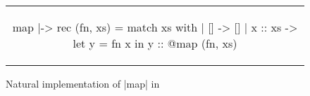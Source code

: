 \begin{figure}[tp]
\begin{tabular}{c}
\begin{Datalang}
map |-> rec (fn, xs) =
  match xs with
  | [] ->
      []
  | x :: xs ->
      let y = fn x in
      y :: @map (fn, xs)
\end{Datalang}
\end{tabular}
\caption{Natural implementation of \datalang|map| in \DataLang}
\label{fig:map}
\end{figure}